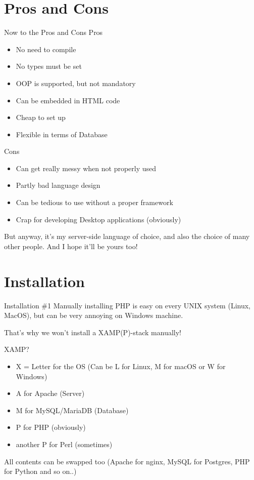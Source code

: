 \section{Pros and Cons}
\begin{frame}{Now to the Pros and Cons}
	Pros
	\begin{itemize}
		\item No need to compile \pause
		\item No types must be set \pause
		\item OOP is supported, but not mandatory \pause
		\item Can be embedded in HTML code \pause
		\item Cheap to set up \pause
		\item Flexible in terms of Database \pause
	\end{itemize}

	Cons
	\begin{itemize}
		\item Can get really messy when not properly used \pause
		\item Partly bad language design \pause
		\item Can be tedious to use without a proper framework \pause
		\item Crap for developing Desktop applications (obviously) \pause
	\end{itemize}

	But anyway, it's my server-side language of choice, and also the choice of many other people. And I hope it'll be yours too!
\end{frame}

\section{Installation}
\begin{frame}{Installation \#{}1}
	Manually installing PHP is easy on every UNIX system (Linux, MacOS), but can be very annoying on Windows machine. \pause

	That's why we won't install a XAMP(P)-stack manually! \pause

	XAMP?\pause
	\begin{itemize}
		\item X = Letter for the OS (Can be L for Linux, M for macOS or W for Windows) \pause
		\item A for Apache (Server) \pause
		\item M for MySQL/MariaDB (Database) \pause
		\item P for PHP (obviously) \pause
		\item another P for Perl (sometimes) \pause
	\end{itemize}

	All contents can be swapped too (Apache for nginx, MySQL for Postgres, PHP for Python and so on..)
\end{frame}

